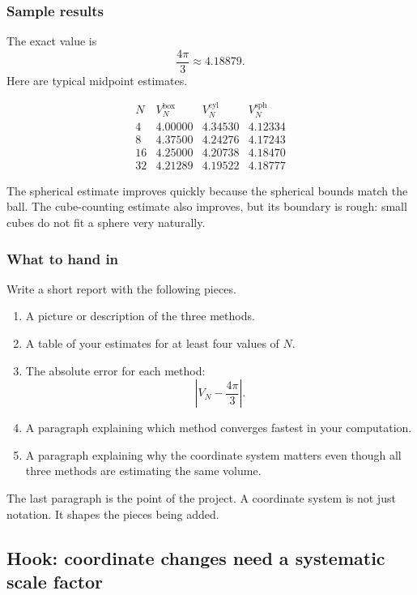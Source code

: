 \subsubsection*{Sample results}

The exact value is
\[
    \frac{4\pi}{3}\approx 4.18879.
\]
Here are typical midpoint estimates.

\[
\begin{array}{c|c|c|c}
N & V_N^{\mathrm{box}} & V_N^{\mathrm{cyl}} & V_N^{\mathrm{sph}} \\ \hline
4  & 4.00000 & 4.34530 & 4.12334\\
8  & 4.37500 & 4.24276 & 4.17243\\
16 & 4.25000 & 4.20738 & 4.18470\\
32 & 4.21289 & 4.19522 & 4.18777
\end{array}
\]

The spherical estimate improves quickly because the spherical bounds match the ball.
The cube-counting estimate also improves, but its boundary is rough: small cubes do not
fit a sphere very naturally.

\subsubsection*{What to hand in}

Write a short report with the following pieces.

\begin{enumerate}
\item A picture or description of the three methods.

\item A table of your estimates for at least four values of \(N\).

\item The absolute error for each method:
\[
    \left|V_N-\frac{4\pi}{3}\right|.
\]

\item A paragraph explaining which method converges fastest in your computation.

\item A paragraph explaining why the coordinate system matters even though all three
methods are estimating the same volume.
\end{enumerate}

The last paragraph is the point of the project.  A coordinate system is not just notation.
It shapes the pieces being added.

\subsection{Hook: coordinate changes need a systematic scale factor}

